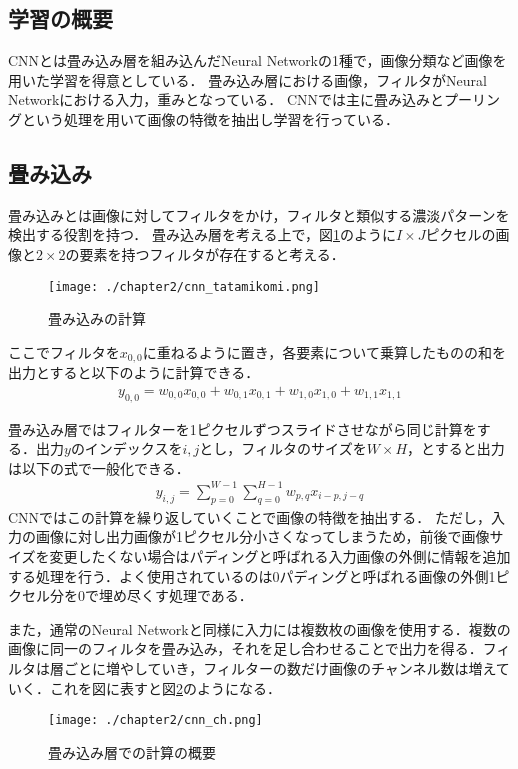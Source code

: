 \subsection{学習の概要}
CNNとは畳み込み層を組み込んだNeural Networkの1種で，画像分類など画像を用いた学習を得意としている．
畳み込み層における画像，フィルタがNeural Networkにおける入力，重みとなっている．
CNNでは主に畳み込みとプーリングという処理を用いて画像の特徴を抽出し学習を行っている\cite{sinsou}．


\subsection{畳み込み}
畳み込みとは画像に対してフィルタをかけ，フィルタと類似する濃淡パターンを検出する役割を持つ．
畳み込み層を考える上で，図\ref{fig_conv}のように$I \times J$ピクセルの画像と$2 \times 2$の要素を持つフィルタが存在すると考える．
\begin{figure}[!b]
  \begin{center}
    \texttt{[image: ./chapter2/cnn\_tatamikomi.png]}
    \caption{畳み込みの計算}
    \label{fig_conv}
  \end{center}
\end{figure}

ここでフィルタを$x_{0,0}$に重ねるように置き，各要素について乗算したものの和を出力とすると以下のように計算できる．
\begin{align}
  y_{0,0} = w_{0,0}x_{0,0} + w_{0,1}x_{0,1} + w_{1,0}x_{1,0} + w_{1,1}x_{1,1}
  \label{nn_sum}
\end{align}

畳み込み層ではフィルターを1ピクセルずつスライドさせながら同じ計算をする．出力$y$のインデックスを$i,j$とし，フィルタのサイズを$W\times H$，とすると出力は以下の式で一般化できる．
\begin{align}
  y_{i,j} = \sum^{W-1}_{p=0} \sum^{H-1}_{q=0} w_{p,q}x_{i-p,j-q}
\end{align}
CNNではこの計算を繰り返していくことで画像の特徴を抽出する．
ただし，入力の画像に対し出力画像が1ピクセル分小さくなってしまうため，前後で画像サイズを変更したくない場合はパディングと呼ばれる入力画像の外側に情報を追加する処理を行う．よく使用されているのは0パディングと呼ばれる画像の外側1ピクセル分を0で埋め尽くす処理である．

また，通常のNeural Networkと同様に入力には複数枚の画像を使用する．複数の画像に同一のフィルタを畳み込み，それを足し合わせることで出力を得る．フィルタは層ごとに増やしていき，フィルターの数だけ画像のチャンネル数は増えていく．これを図に表すと図\ref{fig_cnn_ch}のようになる．
\begin{figure}[!b]
  \begin{center}
    \texttt{[image: ./chapter2/cnn\_ch.png]}
    \caption{畳み込み層での計算の概要}
    \label{fig_cnn_ch}
  \end{center}
\end{figure}

